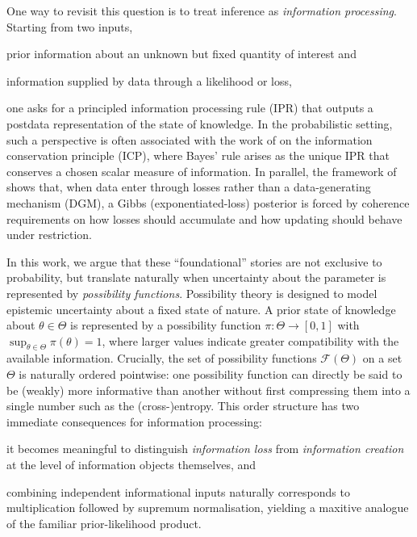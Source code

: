 \documentclass[accepted]{uai2026} %
\theoremstyle{remark}
\begin{document}
One way to revisit this question is to treat inference as \emph{information processing}. Starting from two inputs,
\begin{enumerate*}[label=\roman*)]
\item prior information about an unknown but fixed quantity of interest and
\item information supplied by data through a likelihood or loss,
\end{enumerate*}
one asks for a principled information processing rule (IPR) that outputs a postdata representation of the state of knowledge. In the probabilistic setting, such a perspective is often associated with the work of \citet{zellner1988optimal} on the information conservation principle (ICP), where Bayes' rule arises as the unique IPR that conserves a chosen scalar measure of information. In parallel, the framework of \citet{bissiri2016general} shows that, when data enter through losses rather than a data-generating mechanism (DGM), a Gibbs (exponentiated-loss) posterior is forced by coherence requirements on how losses should accumulate and how updating should behave under restriction.

In this work, we argue that these ``foundational'' stories are not exclusive to probability, but translate naturally when uncertainty about the parameter is represented by \emph{possibility functions}. Possibility theory \citep{zadeh1978fuzzy} is designed to model epistemic uncertainty about a fixed state of nature. A prior state of knowledge about $\theta\in\Theta$ is represented by a possibility function $\pi:\Theta\to[0,1]$ with $\sup_{\theta\in\Theta}\pi(\theta)=1$, where larger values indicate greater compatibility with the available information. Crucially, the set of possibility functions $\mathcal{F}(\Theta)$ on a set $\Theta$ is naturally ordered pointwise: one possibility function can directly be said to be (weakly) more informative than another without first compressing them into a single number such as the (cross-)entropy. This order structure has two immediate consequences for information processing:
\begin{enumerate*}[label=\roman*)]
\item it becomes meaningful to distinguish \emph{information loss} from \emph{information creation} at the level of information objects themselves, and
\item combining independent informational inputs naturally corresponds to multiplication followed by supremum normalisation, yielding a maxitive analogue of the familiar prior-likelihood product.
\end{enumerate*}
\end{document}
